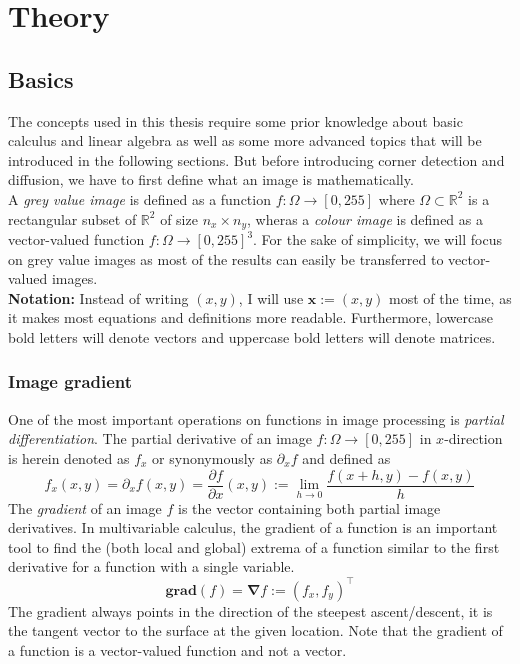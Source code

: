 \newcommand{\TODO}[1]{\ \\ \textbf{\textcolor{red}{!! #1 !!}}\\}
\chapter{Theory}\label{ch:Theory}
\section{Basics}\label{sec:Basics}
The concepts used in this thesis require some prior knowledge about basic calculus and linear
algebra as well as some more advanced topics that will be introduced in the following sections.
But before introducing corner detection and diffusion, we have to first define what an image is
mathematically.\\
A \textit{grey value image} is defined as a function $f: \Omega \rightarrow [0, 255]$ where
$\Omega \subset \mathbb{R}^2$ is a rectangular subset of $\mathbb{R}^2$ of size $n_x\times n_y$,
wheras a
\textit{colour image} is defined as a vector-valued function $f: \Omega \rightarrow [0, 255]^3$.
For the sake of simplicity, we will focus on grey value images as most of the results can easily be
transferred to vector-valued images.\\
\textbf{Notation:} Instead of writing $(x, y)$, I will use $\boldsymbol x := (x, y)$ most of the
time, as it makes most equations and definitions more readable. Furthermore, lowercase bold letters will denote vectors and uppercase bold letters will
denote matrices.
\subsection{Image gradient}
One of the most important operations on functions in image processing is \textit{partial
    differentiation}.
The partial derivative of an image $f: \Omega \rightarrow [0, 255]$ in $x$-direction is herein denoted as $f_x$ or
synonymously as $\partial_x f$ and defined as
\begin{equation}
    f_x(x, y) = \partial_x f (x, y) = \frac{\partial f}{\partial x} (x, y) := \lim_{h \to 0}\frac{f(x+h, y) -f(x, y)}{h} 
\end{equation}
The \textit{gradient} of an image $f$ is the vector containing both partial image derivatives.
In multivariable calculus, the gradient of a function is an important tool to find the (both local
and global) extrema of a function similar to the first derivative for a function with a single
variable.
\begin{equation}
    \textbf{grad}(f) = \boldsymbol\nabla f := \left(f_x, f_y\right)^\top
\end{equation}
The gradient always points in the direction of the steepest ascent/descent, it is the tangent
vector to the surface at the given location\cite{mfi3}.
Note that the gradient of a function is a vector-valued function and not a vector.

